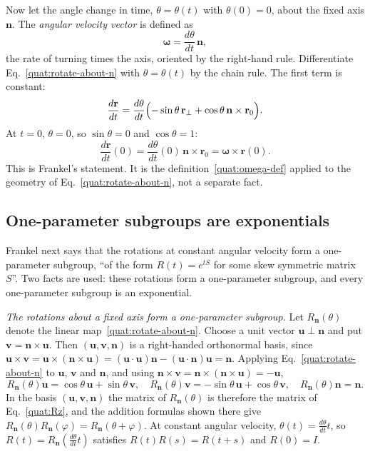 Now let the angle change in time, $\theta=\theta(t)$ with $\theta(0)=0$,
about the fixed axis $\mathbf n$. The \emph{angular velocity vector} is
defined as
\begin{equation}\label{quat:omega-def}
 \boldsymbol\omega=\frac{d\theta}{dt}\,\mathbf n ,
\end{equation}
the rate of turning times the axis, oriented by the right-hand rule.
Differentiate Eq.~\eqref{quat:rotate-about-n} with $\theta=\theta(t)$ by the
chain rule. The first term is constant:
\begin{equation}
 \frac{d\mathbf r}{dt}
 =\frac{d\theta}{dt}\Bigl(-\sin\theta\,\mathbf r_\perp
   +\cos\theta\,\mathbf n\times\mathbf r_0\Bigr).
\end{equation}
At $t=0$, $\theta=0$, so $\sin\theta=0$ and $\cos\theta=1$:
\begin{equation}\label{quat:drdt-omega}
 \frac{d\mathbf r}{dt}(0)=\frac{d\theta}{dt}(0)\,\mathbf n\times\mathbf r_0
 =\boldsymbol\omega\times\mathbf r(0).
\end{equation}
This is Frankel's statement. It is the definition~\eqref{quat:omega-def}
applied to the geometry of Eq.~\eqref{quat:rotate-about-n}, not a separate
fact.

\subsection{One-parameter subgroups are exponentials}
Frankel next says that the rotations at constant angular velocity form a
one-parameter subgroup, ``of the form $R(t)=e^{tS}$ for some skew symmetric
matrix $S$''. Two facts are used: these rotations form a one-parameter
subgroup, and every one-parameter subgroup is an exponential.

\emph{The rotations about a fixed axis form a one-parameter subgroup.} Let
$R_{\mathbf n}(\theta)$ denote the linear map~\eqref{quat:rotate-about-n}.
Choose a unit vector $\mathbf u\perp\mathbf n$ and put
$\mathbf v=\mathbf n\times\mathbf u$. Then $(\mathbf u,\mathbf v,\mathbf n)$
is a right-handed orthonormal basis, since
$\mathbf u\times\mathbf v=\mathbf u\times(\mathbf n\times\mathbf u)
=(\mathbf u\cdot\mathbf u)\mathbf n-(\mathbf u\cdot\mathbf n)\mathbf u
=\mathbf n$. Applying Eq.~\eqref{quat:rotate-about-n} to $\mathbf u$,
$\mathbf v$ and $\mathbf n$, and using
$\mathbf n\times\mathbf v=\mathbf n\times(\mathbf n\times\mathbf u)=-\mathbf u$,
\begin{equation}
 R_{\mathbf n}(\theta)\mathbf u=\cos\theta\,\mathbf u+\sin\theta\,\mathbf v,
 \quad
 R_{\mathbf n}(\theta)\mathbf v=-\sin\theta\,\mathbf u+\cos\theta\,\mathbf v,
 \quad
 R_{\mathbf n}(\theta)\mathbf n=\mathbf n .
\end{equation}
In the basis $(\mathbf u,\mathbf v,\mathbf n)$ the matrix of
$R_{\mathbf n}(\theta)$ is therefore the matrix of Eq.~\eqref{quat:Rz}, and
the addition formulas shown there give
$R_{\mathbf n}(\theta)R_{\mathbf n}(\varphi)=R_{\mathbf n}(\theta+\varphi)$.
At constant angular velocity, $\theta(t)=\frac{d\theta}{dt}t$, so
$R(t)=R_{\mathbf n}(\frac{d\theta}{dt}t)$ satisfies
$R(t)R(s)=R(t+s)$ and $R(0)=I$.

